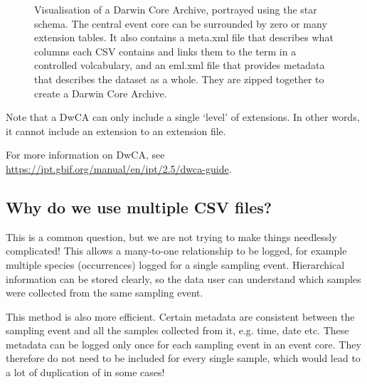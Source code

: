 \documentclass[a4paper,english, 11pt]{article}
\begin{document}
\begin{figure}[htb]
    \caption{\label{fig:dwca}
        Visualisation of a Darwin Core Archive, portrayed using the star schema. The
        central event core can be surrounded by zero or many extension tables.
        It also contains a meta.xml file that describes what columns each CSV contains and links them to the term in a controlled volcabulary, and an eml.xml file that provides metadata that describes the dataset as a whole. They are zipped together to create a Darwin Core Archive.
    }
\end{figure}

Note that a DwCA can only include a single `level' of extensions. In other words, it cannot include an extension to an extension file.

For more information on DwCA, see \url{https://ipt.gbif.org/manual/en/ipt/2.5/dwca-guide}.

\subsection{Why do we use multiple CSV files?}
\label{ss:multiplefiles}

This is a common question, but we are not trying to make things needlessly complicated! This allows a many-to-one relationship to be logged, for example multiple species (occurrences) logged for a single sampling event. Hierarchical information can be stored clearly, so the data user can understand which samples were collected from the same sampling event.

This method is also more efficient. Certain metadata are consistent between the sampling event and all the samples collected from it, e.g. time, date etc. These metadata can be logged only once for each sampling event in an event core. They therefore do not need to be included for every single sample, which would lead to a lot of duplication of in some cases!
\end{document}
